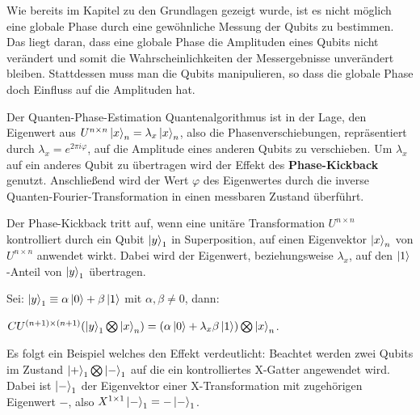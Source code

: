 Wie bereits im Kapitel zu den Grundlagen gezeigt wurde, 
ist es nicht möglich eine globale Phase durch eine gewöhnliche Messung der Qubits zu bestimmen. 
Das liegt daran, 
dass eine globale Phase die Amplituden eines Qubits nicht verändert und somit die Wahrscheinlichkeiten der Messergebnisse unverändert bleiben.
Stattdessen muss man die Qubits manipulieren, so dass die globale Phase doch Einfluss auf die Amplituden hat.

Der Quanten-Phase-Estimation Quantenalgorithmus ist in der Lage, 
den Eigenwert aus \(U^{n\times n}\ket{x}_n=\lambda_x\ket{x}_n\), also die Phasenverschiebungen, repräsentiert durch \(\lambda_x = e^{2\pi i \varphi}\),
auf die Amplitude eines anderen Qubits zu verschieben.
Um \(\lambda_x\) auf ein anderes Qubit zu übertragen wird der Effekt des \textbf{Phase-Kickback} genutzt.
Anschließend wird der Wert \(\varphi\) des Eigenwertes durch die inverse Quanten-Fourier-Transformation in einen messbaren Zustand überführt.

Der Phase-Kickback tritt auf,
wenn eine unitäre Transformation \(U^{n\times n}\) kontrolliert durch ein Qubit \(\ket{y}_1\) in Superposition, 
auf einen Eigenvektor \(\ket{x}_n\) von \(U^{n\times n}\) anwendet wirkt.
Dabei wird der Eigenwert, beziehungsweise \(\lambda_x\), auf den \(\ket{1}\)-Anteil von \(\ket{y}_1\)
übertragen.

Sei: \(\ket{y}_1 \equiv \alpha\ket{0} + \beta\ket{1}\) mit \(\alpha,\beta \neq 0\), 
dann:

\(CU^{(n+1)\times (n+1)}(\ket{y}_1\bigotimes\ket{x}_n)=(\alpha\ket{0} + \lambda_x\beta\ket{1})\bigotimes\ket{x}_n\).

Es folgt ein Beispiel welches den Effekt verdeutlicht:
Beachtet werden zwei Qubits im Zustand \(\ket{+}_1 \bigotimes \ket{-}_1\) auf die ein kontrolliertes X-Gatter angewendet wird.
Dabei ist \(\ket{-}_1\) der Eigenvektor einer X-Transformation mit zugehörigen Eigenwert \(-\), also \(X^{1\times 1}\ket{-}_1=-\ket{-}_1\).


